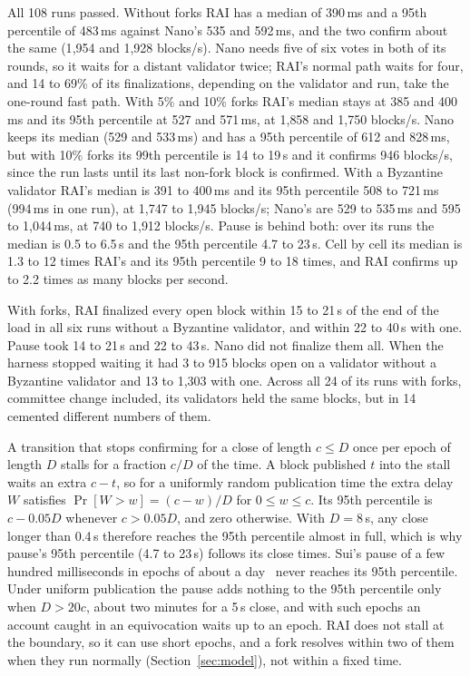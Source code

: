 All 108 runs passed. Without forks RAI has a median of 390\,ms and a 95th percentile of 483\,ms against Nano's 535 and 592\,ms, and the two confirm about the same (1{,}954 and 1{,}928 blocks/s). Nano needs five of six votes in both of its rounds, so it waits for a distant validator twice; RAI's normal path waits for four, and 14 to 69\% of its finalizations, depending on the validator and run, take the one-round fast path. With 5\% and 10\% forks RAI's median stays at 385 and 400\,ms and its 95th percentile at 527 and 571\,ms, at 1{,}858 and 1{,}750 blocks/s. Nano keeps its median (529 and 533\,ms) and has a 95th percentile of 612 and 828\,ms, but with 10\% forks its 99th percentile is 14 to 19\,s and it confirms 946 blocks/s, since the run lasts until its last non-fork block is confirmed. With a Byzantine validator RAI's median is 391 to 400\,ms and its 95th percentile 508 to 721\,ms (994\,ms in one run), at 1{,}747 to 1{,}945 blocks/s; Nano's are 529 to 535\,ms and 595 to 1{,}044\,ms, at 740 to 1{,}912 blocks/s. Pause is behind both: over its runs the median is 0.5 to 6.5\,s and the 95th percentile 4.7 to 23\,s. Cell by cell its median is 1.3 to 12 times RAI's and its 95th percentile 9 to 18 times, and RAI confirms up to 2.2 times as many blocks per second.

With forks, RAI finalized every open block within 15 to 21\,s of the end of the load in all six runs without a Byzantine validator, and within 22 to 40\,s with one. Pause took 14 to 21\,s and 22 to 43\,s. Nano did not finalize them all. When the harness stopped waiting it had 3 to 915 blocks open on a validator without a Byzantine validator and 13 to 1{,}303 with one. Across all 24 of its runs with forks, committee change included, its validators held the same blocks, but in 14 cemented different numbers of them.

A transition that stops confirming for a close of length $c\le D$ once per epoch of length $D$ stalls for a fraction $c/D$ of the time. A block published $t$ into the stall waits an extra $c-t$, so for a uniformly random publication time the extra delay $W$ satisfies $\Pr[W>w]=(c-w)/D$ for $0\le w\le c$. Its 95th percentile is $c-0.05D$ whenever $c>0.05D$, and zero otherwise. With $D=8$\,s, any close longer than 0.4\,s therefore reaches the 95th percentile almost in full, which is why pause's 95th percentile (4.7 to 23\,s) follows its close times. Sui's pause of a few hundred milliseconds in epochs of about a day~\cite{sui2026epochs,sui2026lifecycle} never reaches its 95th percentile. Under uniform publication the pause adds nothing to the 95th percentile only when $D>20c$, about two minutes for a 5\,s close, and with such epochs an account caught in an equivocation waits up to an epoch. RAI does not stall at the boundary, so it can use short epochs, and a fork resolves within two of them when they run normally (Section~\ref{sec:model}), not within a fixed time.

